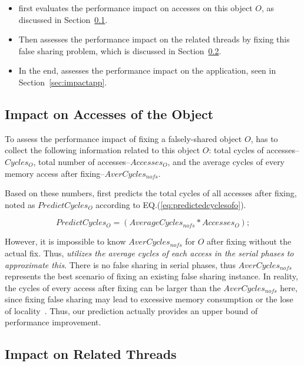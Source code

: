 \begin{itemize}
\item \cheetah{} first evaluates the performance impact on accesses on this object $O$, as discussed in Section~\ref{sec:impactobject}. 

\item Then \cheetah{} assesses the performance impact on the related threads by fixing this false sharing problem, which is discussed in Section~\ref{sec:impactthread}. 
 
\item In the end, \cheetah{} assesses the performance impact on the application, seen in Section~\ref{sec:impactapp}. 
\end{itemize}


\subsection{Impact on Accesses of the Object}
\label{sec:impactobject}

To assess the performance impact of fixing a falsely-shared object $O$, \cheetah{} has to collect the following information related to this object $O$:  total cycles of accesses-- $Cycles_O$, total number of accesses--$Accesses_O$, and the average cycles of every memory access after fixing--$AverCycles_{nofs}$.

Based on these numbers, \cheetah{} first predicts the total cycles of all accesses after fixing, noted as $PredictCycles_{O}$ according to EQ.(\ref{eq:predictedcyclesofo}).   
 
\begin{equation}
\label{eq:predictedcyclesofo}
 PredictCycles_{O} = (AverageCycles_{nofs} * Accesses_O);
\end{equation} 
 
However, it is impossible to know $AverCycles_{nofs}$ for $O$ after fixing without the actual fix. Thus, {\it \cheetah{} utilizes the average cycles of each access in the serial phases to approximate this}. There is no false sharing in serial phases, thus $AverCycles_{nofs}$ represents the best scenario of fixing an existing false sharing instance. In reality, the cycles of every access after fixing can be larger than the $AverCycles_{nofs}$ here, since fixing false sharing may lead to excessive memory consumption or the lose of locality~\cite{qinzhao}. Thus, our prediction actually provides an upper bound of performance improvement. 
 
\subsection{Impact on Related Threads}
\label{sec:impactthread}

